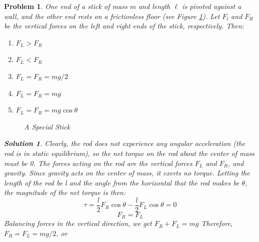 \documentclass[12pt]{article}
\newtheorem*{solution}{Solution}
\theoremstyle{mystyle}
\newtheorem{pproblem}{Problem}
\begin{document}
\begin{pproblem}
    One end of a stick of mass $m$ and length $\ell$ is pivoted against a wall,
    and the other end rests on a frictionless floor (see Figure \ref{pivoted plane}).
    Let $F_l$ and $F_R$ be the vertical forces on the left and right ends of the stick,
    respectively. Then:
    \begin{enumerate}[(\Alph*)]
        \item $F_L>F_R$
        \item $F_L<F_R$
        \item $F_L=F_R=mg/2$
        \item $F_L=F_R=mg$
        \item $F_L=F_R=mg\cos\theta$
    \end{enumerate}

    \begin{figure}[H]
        \centering
        \caption{A Special Stick}
        \label{pivoted plane}
    \end{figure}

    \begin{solution}
        Clearly, the rod does not experience any angular acceleration (the rod is in static equilibrium), so the net torque on the rod about the center of mass must be 0. The forces acting on the rod are the vertical forces $F_L$ and $F_R$, and gravity. Since gravity acts on the center of mass, it exerts no torque. Letting the length of the rod be l and the angle from the horizontal that the rod makes be $\theta$, the magnitude of the net torque is then:
        $$\tau = \frac{l}{2}F_R\cos \theta - \frac{l}{2}F_L\cos \theta = 0$$
        $$F_R = F_L$$
        Balancing forces in the vertical direction, we get $F_R + F_L = mg$
        Therefore, $F_R = F_L = mg/2$, or 
    \end{solution}
\end{pproblem}
\end{document}

